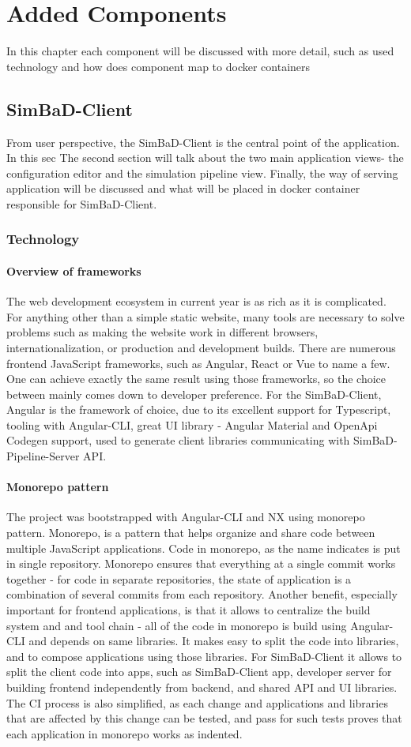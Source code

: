 \chapter{Added Components}
In this chapter each component will be discussed with more detail, such as used technology and how does component map to docker containers
\section{SimBaD-Client}
From user perspective, the SimBaD-Client is the central point of the application. In this sec
The second section will talk about the two main application views- the configuration editor and the simulation pipeline view. Finally, the way of serving application will be discussed and what will be placed in docker container responsible for SimBaD-Client.
\subsection{Technology}
\subsubsection{Overview of frameworks}
The web development ecosystem in current year is as rich as it is complicated.  For anything other than a simple static website, many tools are necessary to solve problems such as making the website work in different browsers, internationalization, or production and development builds. There are numerous frontend JavaScript frameworks, such as Angular, React or Vue to name a few. One can achieve exactly the same result using those frameworks, so the choice between mainly comes down to developer preference. For the SimBaD-Client, Angular is the framework of choice, due to its excellent support for Typescript, tooling with Angular-CLI, great UI library - Angular Material and OpenApi Codegen support, used to generate client libraries communicating with SimBaD-Pipeline-Server API. 
\subsubsection{Monorepo pattern}
The project was bootstrapped with Angular-CLI and NX using monorepo pattern. Monorepo, is a pattern that helps organize and share code between multiple JavaScript applications. Code in monorepo, as the name indicates is put in single repository. Monorepo ensures that everything at a single commit works together - for code in separate repositories, the state of application is a combination of several commits from each repository. Another benefit, especially important for frontend applications, is that it allows to centralize the build system and and tool chain - all of the code in monorepo is build using Angular-CLI and depends on same libraries. It makes easy to split the code into libraries, and to compose applications using those libraries. For SimBaD-Client it allows to split the client code into apps, such as SimBaD-Client app, developer server for building frontend independently from backend, and shared API and UI libraries. The CI process is also simplified, as each change and applications and libraries that are affected by this change can be tested, and pass for such tests proves that each application in monorepo works as indented.
